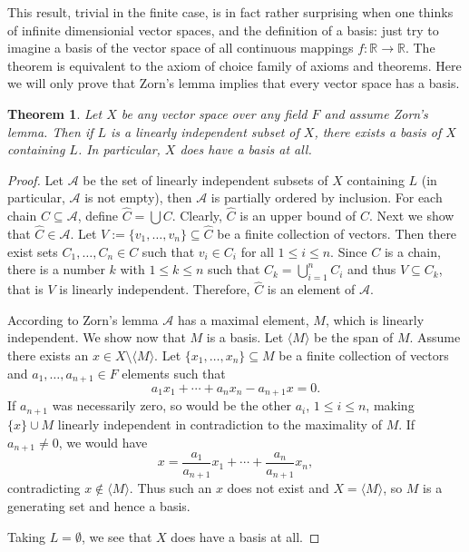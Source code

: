 \documentclass[12pt]{article}
\newcommand{\<}{\langle}
\renewcommand{\>}{\rangle}
\newcommand{\Bigcup}{\bigcup\limits}
\newcommand{\h}{\widehat}
\newcommand{\mbb}{\mathbb}
\newcommand{\mc}{\mathcal}
\begin{document}
This result, trivial in the finite case, is in fact rather surprising
when one thinks of infinite dimensionial vector spaces, and the
definition of a basis: just try to imagine a basis of the vector space
of all continuous mappings $f\colon\mbb{R}\to\mbb{R}$. The theorem is
equivalent to the axiom of choice family of axioms and theorems. Here
we will only prove that Zorn's lemma implies that every vector space
has a basis.

\newtheorem*{thm}{Theorem}
\begin{thm}
Let $X$ be any vector space over any field $F$ and assume Zorn's
lemma. Then if $L$ is a linearly independent subset of $X$, there
exists a basis of $X$ containing $L$. In particular, $X$ does have a
basis at all.
\end{thm}
\begin{proof}
Let $\mc{A}$ be the set of linearly independent subsets of $X$
containing $L$ (in particular, $\mc{A}$ is not empty), then $\mc{A}$
is partially ordered by inclusion. For each chain $C\subseteq\mc{A}$,
define $\h{C}=\bigcup C$. Clearly, $\h{C}$ is an upper bound of $C$. Next we
show that $\h{C}\in\mc{A}$. Let $V:=\{v_1,\ldots,v_n\}\subseteq\h{C}$
be a finite collection of vectors. Then there exist sets $C_1,\ldots,
C_n\in C$ such that $v_i\in C_i$ for all $1\leq i\leq n$. Since $C$ is
a chain, there is a number $k$ with $1\leq k\leq n$ such that
$C_k=\Bigcup_{i=1}^nC_i$ and thus $V\subseteq C_k$, that is $V$ is
linearly independent. Therefore, $\h{C}$ is an element of $\mc{A}$.

According to Zorn's lemma $\mc{A}$ has a maximal element, $M$, which
is linearly independent. We show now that $M$ is a basis. Let $\langle M\rangle$
be the span of $M$. Assume there exists an $x\in X\setminus\langle M\rangle$. Let
$\{x_1,\ldots,x_n\}\subseteq M$ be a finite collection of vectors and
$a_1,\ldots,a_{n+1}\in F$ elements such that
\begin{equation*}
a_1x_1+\cdots+a_nx_n-a_{n+1}x=0.
\end{equation*}
If $a_{n+1}$ was necessarily zero, so would be the other $a_i$, $1\leq i\leq n$,
making $\{x\}\cup M$ linearly independent in contradiction to the
maximality of $M$. If $a_{n+1}\neq 0$, we would have
\begin{equation*}
x=\frac{a_1}{a_{n+1}}x_1+\cdots+\frac{a_n}{a_{n+1}}x_n,
\end{equation*}
contradicting $x\notin\langle M\rangle$. Thus such an $x$ does not exist and
$X=\langle M\rangle$, so $M$ is a generating set and hence a basis.

Taking $L=\emptyset$, we see that $X$ does have a basis at all.
\end{proof}

\end{document}
